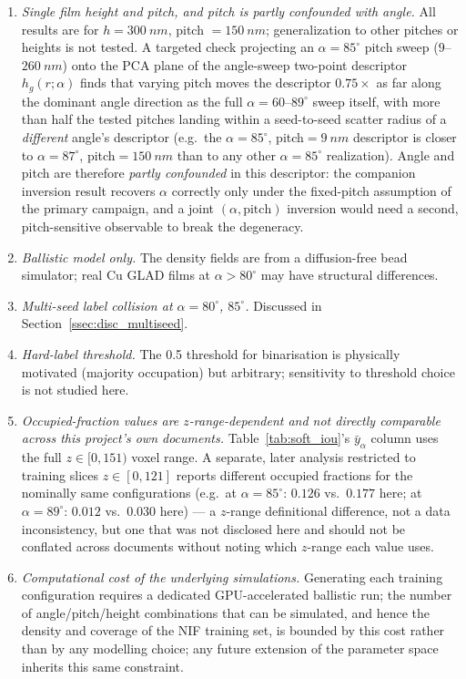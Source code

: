 \documentclass[aip,amsmath,amssymb,reprint]{revtex4-1}
\renewcommand{\ang}{\ensuremath{\alpha}} %
\begin{document}
\begin{enumerate}
  \item \textit{Single film height and pitch, and pitch is partly
    confounded with angle.} All results are for $h = \SI{300}{nm}$,
    pitch $= \SI{150}{nm}$; generalization to other pitches or heights is
    not tested. A targeted check projecting an $\ang=85^{\circ}$
    pitch sweep ($9$--$\SI{260}{nm}$) onto the PCA plane of the
    angle-sweep two-point descriptor $h_g(r;\ang)$ finds that varying
    pitch moves the descriptor $0.75\times$ as far along the dominant
    angle direction as the full $\ang=60$--$89^{\circ}$ sweep itself,
    with more than half the tested pitches landing within a
    seed-to-seed scatter radius of a \emph{different} angle's
    descriptor (e.g.\ the $\ang=85^{\circ}$, pitch$=\SI{9}{nm}$
    descriptor is closer to $\ang=87^{\circ}$, pitch$=\SI{150}{nm}$
    than to any other $\ang=85^{\circ}$ realization). Angle and pitch
    are therefore \emph{partly confounded} in this descriptor: the
    companion inversion result \citep{companionP1} recovers $\ang$
    correctly only under the fixed-pitch assumption of the primary
    campaign, and a joint $(\ang,\text{pitch})$ inversion would need a
    second, pitch-sensitive observable to break the degeneracy.
  \item \textit{Ballistic model only.} The density fields are from
    a diffusion-free bead simulator; real Cu GLAD films at
    $\ang > 80^{\circ}$ may have structural differences.
  \item \textit{Multi-seed label collision at $\ang = 80^{\circ}$, $85^{\circ}$.}
    Discussed in Section~\ref{ssec:disc_multiseed}.
  \item \textit{Hard-label threshold.} The 0.5 threshold for
    binarisation is physically motivated (majority occupation) but
    arbitrary; sensitivity to threshold choice is not studied here.
  \item \textit{Occupied-fraction values are $z$-range-dependent and
    not directly comparable across this project's own documents.}
    Table~\ref{tab:soft_iou}'s $\bar{y}_\alpha$ column uses the full
    $z\in[0,151)$ voxel range. A separate, later analysis restricted
    to training slices $z\in[0,121]$ reports different occupied
    fractions for the nominally same configurations (e.g.\ at
    $\ang=85^{\circ}$: $0.126$ vs.\ $0.177$ here; at $\ang=89^{\circ}$: $0.012$
    vs.\ $0.030$ here) — a $z$-range definitional difference, not a
    data inconsistency, but one that was not disclosed here and
    should not be conflated across documents without noting which
    $z$-range each value uses.
  \item \textit{Computational cost of the underlying simulations.}
    Generating each training configuration requires a dedicated
    GPU-accelerated ballistic run; the number of angle/pitch/height
    combinations that can be simulated, and hence the density and
    coverage of the NIF training set, is bounded by this cost rather
    than by any modelling choice; any future extension of the
    parameter space inherits this same constraint.
\end{enumerate}
\end{document}
